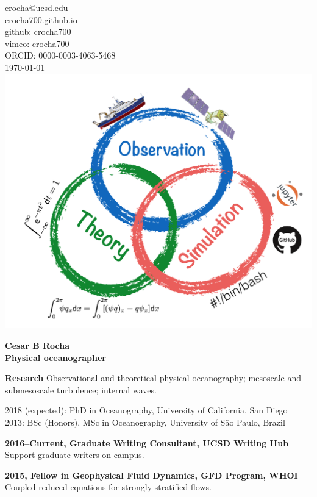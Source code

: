 \documentclass[a4paper,11pt,final]{memoir}
\newcommand{\Sep}{\vspace{1.25em}}
\newcommand{\SmallSep}{\vspace{0.5em}}
\newenvironment{Research}
    {\ignorespaces\textbf{\color{NavyBlue} Research}}
\newcommand{\CVSection}[1]
    {\Large\textbf{#1}\par
    \SmallSep\normalsize\normalfont}
\newcommand{\CVItem}[1]
    {\textbf{\color{NavyBlue} #1}}
\begin{document}
%

\begin{flushright}\small
    crocha@ucsd.edu\\[.1cm]
    crocha700.github.io\\[.1cm]
    github: crocha700\\[.1cm]
    vimeo: crocha700\\[.1cm]
    ORCID: 0000-0003-4063-5468\\[.1cm]
    \textcolor[gray]{0.45}{\mydate\today}\\[.1cm]
    \includegraphics[width=.185\textwidth]{theory_comp_obs2.png}
\end{flushright}\normalsize
\framebreak

\Huge\bfseries { \color{NavyBlue}  Cesar B Rocha} \\
\Large\bfseries Physical oceanographer \\

\normalsize\normalfont

\begin{Research}
Observational and theoretical physical oceanography; mesoscale and submesoscale turbulence; internal waves.
\end{Research}

\Sep


2018 (expected): PhD in Oceanography, University of California, San Diego \\
2013: BSc (Honors), MSc in Oceanography, University of S\~ao Paulo, Brazil

\Sep


\CVItem{2016--Current, Graduate Writing Consultant, UCSD Writing Hub}\\
Support graduate writers on campus.

\SmallSep
\CVItem{2015, Fellow in Geophysical Fluid Dynamics, GFD Program, WHOI}\\
Coupled reduced equations for strongly stratified flows.
\SmallSep
\end{document}
